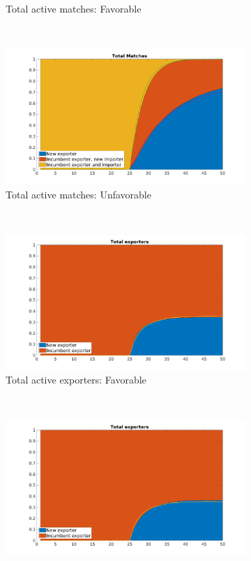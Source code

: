 \documentclass[12pt]{article}
\begin{document}
\begin{figure}[tbp]
\begin{subfigure}[b]{0.5\textwidth}
        \caption{Total active matches: Favorable}
    \end{subfigure} ~ 
\begin{subfigure}[b]{0.5\textwidth}
        \centering
        \includegraphics[width=\textwidth]{figures/total_matches_pct_unf}
        \caption{Total active matches: Unfavorable}
    \end{subfigure} \newline
~ 
\begin{subfigure}[b]{0.5\textwidth}
        \centering
        \includegraphics[width=\textwidth]{figures/total_firms_pct}
        \caption{Total active exporters: Favorable}
    \end{subfigure} ~ 
\begin{subfigure}[b]{0.5\textwidth}
        \centering
        \includegraphics[width=\textwidth]{figures/total_firms_pct_unf}

\end{subfigure}
\end{figure}
\end{document}
